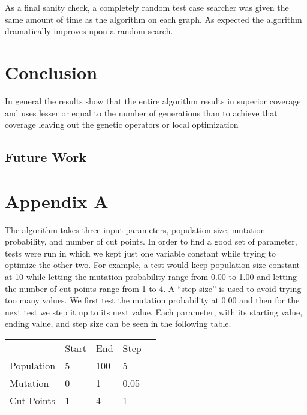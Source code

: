 \documentclass[runningheads]{llncs}
\begin{document}
As a final sanity check, a completely random test case searcher was given the same amount of time as the algorithm on each graph. As expected the algorithm dramatically improves upon a random search.
 

\newpage
\section{Conclusion}


In general the results show that the entire algorithm results in superior coverage and uses lesser or equal to the number of generations than to achieve that coverage leaving out the genetic operators or local optimization

\subsection{Future Work}

\newpage
\section*{Appendix A}

The algorithm takes three input parameters, population size, mutation probability, and number of cut points. In order to find a good set of parameter, tests were run in which we kept just one variable constant while trying to optimize the other two. For example, a test would keep population size constant at 10 while letting the mutation probability range from 0.00 to 1.00 and letting the number of cut points range from 1 to 4. A ``step size'' is used to avoid trying too many values. We first test the mutation probability at 0.00 and then for the next test we step it up to its next value. Each parameter, with its starting value, ending value, and step size can be seen in the following table.

\begin{table}[h]
\begin{tabular}{l|l|l|l|l}
	\cline{2-4}
	                                 & Start & End & Step &  \\ \cline{1-4}
	\multicolumn{1}{|l|}{Population} & 5     & 100 & 5    &  \\ \cline{1-4}
	\multicolumn{1}{|l|}{Mutation}   & 0     & 1   & 0.05 &  \\ \cline{1-4}
	\multicolumn{1}{|l|}{Cut Points} & 1     & 4   & 1    &  \\ \cline{1-4}
\end{tabular}
\end{table}
\end{document}
